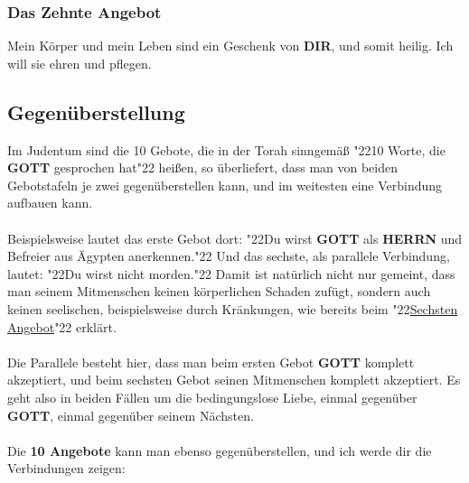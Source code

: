 \documentclass[12pt,a5paper]{article}
\newcommand{\Dir}[0]{\textbf{DIR}}
\newcommand{\Gott}[0]{\textbf{GOTT}}
\newcommand{\Herrn}[0]{\textbf{HERRN}}
\newcommand{\q}[1]{\char"22{#1}\char"22 }
\begin{document}
	\subsubsection{Das Zehnte Angebot} \label{DasZehnteAngebot}
		Mein K\"orper und mein Leben sind ein Geschenk von {\Dir},
		und somit heilig.
		Ich will sie ehren und pflegen.
	
	\newpage
	\subsection{Gegen\"uberstellung}
		Im Judentum sind die 10 Gebote,
		die in der Torah sinngem\"a{\ss} \q{10 Worte, die {\Gott} gesprochen hat} hei{\ss}en,
		so \"uberliefert,
		dass man von beiden Gebotstafeln je zwei gegen\"uberstellen kann,
		und im weitesten eine Verbindung aufbauen kann.
		\\
		\\
		Beispielsweise lautet das erste Gebot dort:
		\q{Du wirst {\Gott} als {\Herrn} und Befreier aus Ägypten anerkennen.}
		Und das sechste,
		als parallele Verbindung,
		lautet:
		\q{Du wirst nicht morden.}
		Damit ist nat\"urlich nicht nur gemeint,
		dass man seinem Mitmenschen keinen k\"orperlichen Schaden zuf\"ugt,
		sondern auch keinen seelischen,
		beispielsweise durch Kr\"ankungen,
		wie bereits beim \q{\hyperref[DasSechsteAngebot]{Sechsten Angebot}} erkl\"art.
		\\
		\\
		Die Parallele besteht hier,
		dass man beim ersten Gebot {\Gott} komplett akzeptiert,
		und beim sechsten Gebot seinen Mitmenschen komplett akzeptiert.
		Es geht also in beiden F\"allen um die bedingungslose Liebe,
		einmal gegen\"uber {\Gott},
		einmal gegen\"uber seinem N\"achsten.
		\\
		\\
		Die \textbf{10 Angebote} kann man ebenso gegen\"uberstellen,
		und ich werde dir die Verbindungen zeigen:
		\\
\end{document}
